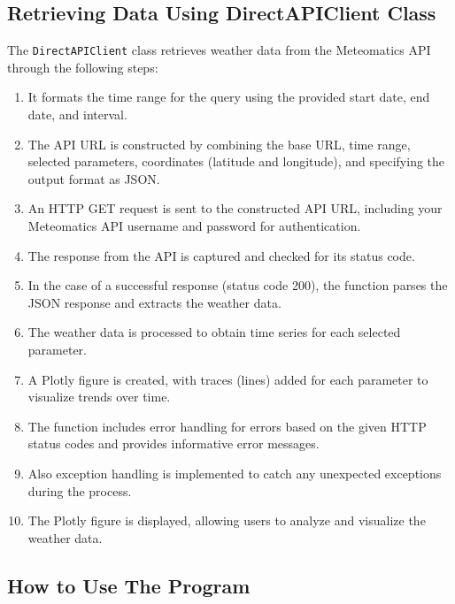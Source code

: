 	\subsection*{Retrieving Data Using DirectAPIClient Class}
	The \texttt{DirectAPIClient} class retrieves weather data from the Meteomatics API through the following steps:
	
	\begin{enumerate}
	\item It formats the time range for the query using the provided start date, end date, and interval.
	\item The API URL is constructed by combining the base URL, time range, selected parameters, coordinates (latitude and longitude), and specifying the output format as JSON.
	\item An HTTP GET request is sent to the constructed API URL, including your Meteomatics API username and password for authentication.
	\item The response from the API is captured and checked for its status code.
	\item In the case of a successful response (status code 200), the function parses the JSON response and extracts the weather data.
	\item The weather data is processed to obtain time series for each selected parameter.
	\item A Plotly figure is created, with traces (lines) added for each parameter to visualize trends over time.
	\item The function includes error handling for errors based on the given HTTP status codes and provides informative error messages.
	\item Also exception handling is implemented to catch any unexpected exceptions during the process.
	\item The Plotly figure is displayed, allowing users to analyze and visualize the weather data.
	\end{enumerate}
	
	\newpage
	\subsection*{How to Use The Program}
	


